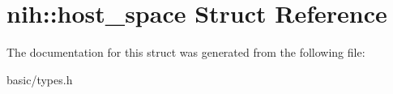 \hypertarget{structnih_1_1host__space}{
\section{nih\-:\-:host\-\_\-space \-Struct \-Reference}
\label{structnih_1_1host__space}
}


\-The documentation for this struct was generated from the following file\-:\begin{DoxyCompactItemize}
\item 
basic/types.\-h\end{DoxyCompactItemize}
